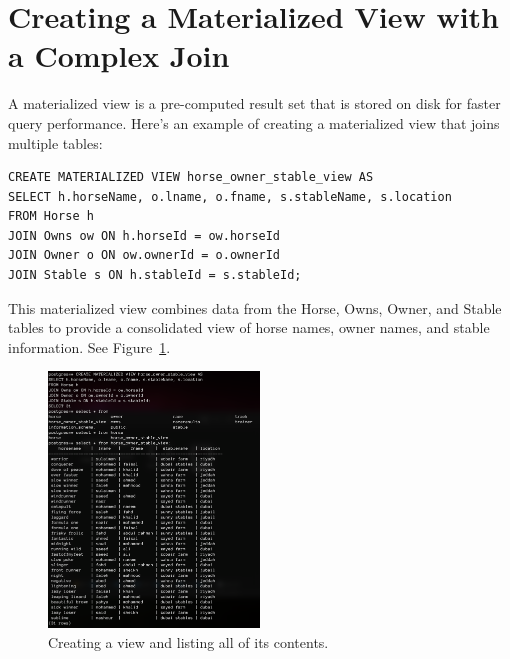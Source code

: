 \documentclass{article}
\begin{document}
\section{Creating a Materialized View with a Complex Join} %
\label{sec:Creating a Materialized View with a Complex Join}
A materialized view is a pre-computed result set that is stored on disk for faster query performance. Here's an example of creating a materialized view that joins multiple tables:
\begin{lstlisting}
CREATE MATERIALIZED VIEW horse_owner_stable_view AS
SELECT h.horseName, o.lname, o.fname, s.stableName, s.location
FROM Horse h
JOIN Owns ow ON h.horseId = ow.horseId
JOIN Owner o ON ow.ownerId = o.ownerId
JOIN Stable s ON h.stableId = s.stableId;
\end{lstlisting}
This materialized view combines data from the Horse, Owns, Owner, and Stable tables to provide a consolidated view of horse names, owner names, and stable information. See Figure~\ref{fig:create view}.
\begin{figure}
	\begin{center}
		\includegraphics[width=0.5\textwidth]{figures/creating_view.png}
	\end{center}
	\caption{Creating a view and listing all of its contents. }\label{fig:create view}
\end{figure}
\end{document}
